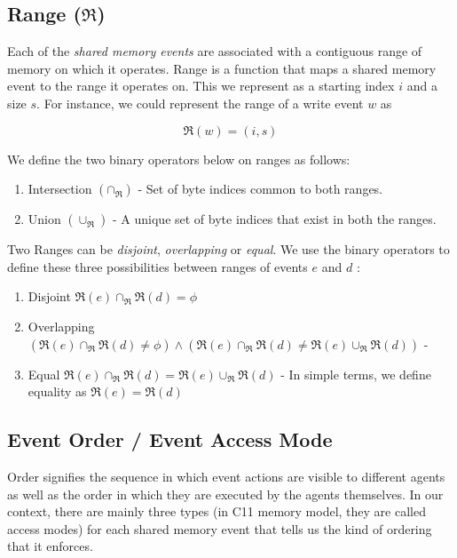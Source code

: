     \subsection{Range ($\Re$)}
        Each of the \textit{shared memory events} are associated with a contiguous range of memory on which it operates. 
        Range is a function that maps a shared memory event to the range it operates on\footnotemark. 
        This we represent as a starting index $i$ and a size $s$. 
        For instance, we could represent the range of a write event $w$ as 
                
                \[\Re(w) = (i, s) \]
    
        
        We define the two binary operators below on ranges as follows:
        \begin{enumerate}
            \item Intersection $(\cap{_\Re})$ - Set of byte indices common to both ranges.
            \item Union $(\cup_\Re)$ - A unique set of byte indices that exist in both the ranges.  
        \end{enumerate}
        
        Two Ranges can be \textit{disjoint}, \textit{overlapping} or \textit{equal}. We use the binary operators to define these three possibilities between ranges of events $e$ and $d$ :
        \begin{enumerate}
            \item Disjoint $\Re(e) \cap_\Re \Re(d) = \phi$ 
            \item Overlapping $(\Re(e)\cap_\Re \Re(d) \neq \phi) \wedge (\Re(e) \cap_\Re  \Re(d) \neq \Re(e) \cup_\Re \Re(d))$ - 
            \item Equal $\Re(e) \cap_\Re  \Re(d) = \Re(e) \cup_\Re \Re(d)$ - In simple terms, we define equality as $\Re(e) = \Re(d)$
        \end{enumerate}
            
    
    \subsection{Event Order / Event Access Mode} 
        Order signifies the sequence in which event actions are visible to different agents as well as the order in which they are executed by the agents themselves. In our context, there are mainly three types (in C11 memory model, they are called access modes) for each shared memory event that tells us the kind of ordering that it enforces. 
        
